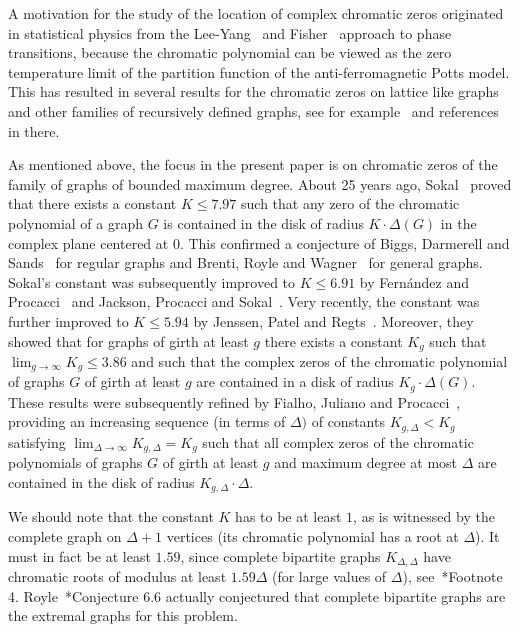 \documentclass[a4paper,11pt,reqno]{amsart}
\numberwithin{equation}{section}
\begin{document}
A motivation for the study of the location of complex chromatic zeros originated in statistical physics from the Lee-Yang~\cite{yang1952statistical} and Fisher~\cite{fisher} approach to phase transitions, because the chromatic polynomial can be viewed as the zero temperature limit of the partition function of the anti-ferromagnetic Potts model.
This has resulted in several results for the chromatic zeros on lattice like graphs and other families of recursively defined graphs, see for example~\cites{Shrocketal1998,Shrock2001,Sokaldense,Sokaletal2001,Sokaletal2003,Sokaletal2009,ChioRoeder,BHRseriesparallelroots23} and references in there.

As mentioned above, the focus in the present paper is on chromatic zeros of the family of graphs of bounded maximum degree.
About 25 years ago,  Sokal~\cite{sokal} proved that there exists a constant $K\le7.97$ such that any zero of the chromatic polynomial of a graph $G$ is contained in the disk of radius $K\cdot \Delta(G)$ in the complex plane centered at $0$. This confirmed a conjecture of Biggs, Darmerell and Sands~\cite{BDS72} for regular graphs and Brenti, Royle and Wagner~\cite{BRW94} for general graphs.
Sokal's constant was subsequently improved to $K\leq 6.91$ by Fern\'andez and Procacci~\cite{Fernandez} and Jackson, Procacci and Sokal~\cites{JacksonSokal}. 
Very recently, the constant was further improved to $K\leq 5.94$ by Jenssen, Patel and Regts~\cite{JPR24}. 
Moreover, they showed that for graphs of girth at least $g$ there exists a constant $K_g$ such that $\lim_{g\to \infty} K_g\leq 3.86$ and such that the complex zeros of the chromatic polynomial of graphs $G$ of girth at least $g$ are contained in a disk of radius $K_g\cdot \Delta(G)$.
These results were subsequently refined by Fialho, Juliano and Procacci~\cite{procacci2024zero}, providing an increasing sequence (in terms of $\Delta)$ of constants $K_{g,\Delta}<K_g$ satisfying $\lim_{\Delta\to \infty} K_{g,\Delta}= K_g$ such that all complex zeros of the chromatic polynomials of graphs $G$ of girth at least $g$ and maximum degree at most $\Delta$ are contained in the disk of radius $K_{g,\Delta}\cdot \Delta$.

We should note that the constant $K$ has to be at least $1$, as is witnessed by the complete graph on $\Delta+1$ vertices (its chromatic polynomial has a root at $\Delta$). It must in fact be at least $1.59$, since complete bipartite graphs $K_{\Delta,\Delta}$ have chromatic roots of modulus at least $1.59 \Delta$ (for large values of $\Delta$), see~\cite{RoyleSokalmaxmax}*{Footnote 4}.
Royle~\cite{Roylesurvey}*{Conjecture 6.6} actually conjectured  that complete bipartite graphs are the extremal graphs for this problem. 
\end{document}
